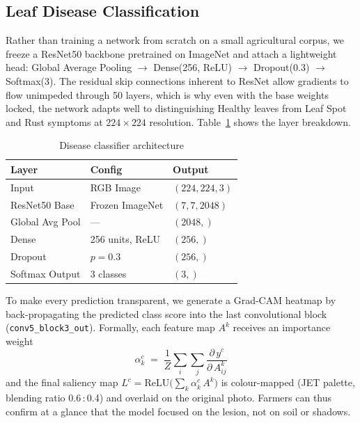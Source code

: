 \documentclass[conference]{IEEEtran}
\begin{document}
\subsection{Leaf Disease Classification}
Rather than training a network from scratch on a small
agricultural corpus, we freeze a ResNet50 backbone pretrained on ImageNet and attach a lightweight
head: Global Average Pooling $\rightarrow$ Dense(256, ReLU) $\rightarrow$ Dropout(0.3) $\rightarrow$
Softmax(3). The residual skip connections inherent to ResNet allow gradients to flow unimpeded
through 50 layers, which is why even with the base weights locked, the network adapts well to
distinguishing Healthy leaves from Leaf Spot and Rust symptoms at $224\times224$ resolution.
Table~\ref{tab:arch} shows the layer breakdown.

\begin{table}[t]
\centering \caption{Disease classifier architecture} \label{tab:arch}
\begin{tabular}{lll}
\toprule
\textbf{Layer} & \textbf{Config} & \textbf{Output} \\
\midrule
Input          & RGB Image           & $(224,224,3)$ \\
ResNet50 Base  & Frozen ImageNet     & $(7,7,2048)$  \\
Global Avg Pool& ---                 & $(2048,)$     \\
Dense          & 256 units, ReLU     & $(256,)$      \\
Dropout        & $p=0.3$             & $(256,)$      \\
Softmax Output & 3 classes           & $(3,)$        \\
\bottomrule
\end{tabular}
\end{table}

To make every prediction transparent, we generate a Grad-CAM heatmap by back-propagating the
predicted class score into the last convolutional block (\texttt{conv5\_block3\_out}). Formally,
each feature map $A^k$ receives an importance weight
\begin{equation}
\alpha_k^c \;=\; \frac{1}{Z}\sum_i\sum_j \frac{\partial\, y^c}{\partial\, A_{ij}^k}
\end{equation}
and the final saliency map $L^c = \mathrm{ReLU}\!\bigl(\sum_k \alpha_k^c\, A^k\bigr)$ is
colour-mapped (JET palette, blending ratio 0.6\,:\,0.4) and overlaid on the original photo. Farmers
can thus confirm at a glance that the model focused on the lesion, not on soil or shadows.
\end{document}

